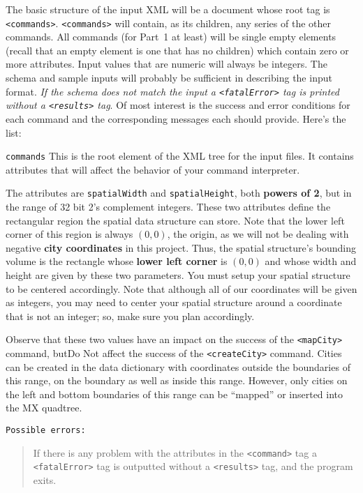 \documentclass[12pt]{article}
\newenvironment{Description}
   {\begin{list}{}{\let\makelabel\Descriptionlabel
      \setlength\leftmargin{\labelwidth+\labelsep}
      \setlength\itemindent{-0.3em}}}%
   {\end{list}}
\newcommand*{\Descriptionlabel}[1]{%
  \parbox[b]{\labelwidth}
  {\makebox[0pt][l]{\textbf{#1}}\\}
  \hfill}
\begin{document}
The basic structure of the input XML will be a document whose root tag
is \texttt{<commands>}.  \texttt{<commands>} will contain, as its
children, any series of the other commands.  All commands (for Part~1
at least) will be single empty elements (recall that an empty element
is one that has no children) which contain zero or more
attributes. Input values that are numeric will always be integers.
The schema and sample inputs will probably be sufficient in describing
the input format.  \emph{If the schema does not match the input a \texttt{<fatalError>} 
tag is printed without a \texttt{<results>} tag}. Of most interest is the success and error
conditions for each command and the corresponding messages each should
provide.  Here's the list:

\begin{Description}

\item[\texttt{commands}] This is the root element of the XML tree for
  the input files.  It contains attributes that will affect the
  behavior of your command interpreter.

The attributes are \texttt{spatialWidth} and
  \texttt{spatialHeight},  both {\bf powers of 2}, but in the range of
   32 bit 2's   complement integers.  These two attributes define the
  rectangular region the spatial data structure can store.  Note that
  the lower left corner of this region is always $(0,0)$, the origin,
  as we will not be dealing with negative {\bf city coordinates} in this project.
  Thus, the spatial structure's bounding volume is the rectangle whose
  {\bf lower left corner} is $(0,0)$ and whose width and height are given by
  these two parameters.  You must setup your spatial structure to be
  centered accordingly.  Note that although all of our coordinates
  will be given as integers, you may need to center your spatial
  structure around a coordinate that is not an integer; so, make sure
  you plan accordingly.

  Observe that these two values  have an impact on the success of 
the \texttt{<mapCity>} command, but{\sc Do Not}  affect the success of the
  \texttt{<createCity>} command.  Cities can be created in the data
  dictionary with coordinates outside the boundaries of this range, on
  the boundary as well as inside this range. However, only cities on
  the left and bottom boundaries of this range can be ``mapped'' or
  inserted into the MX quadtree.
  
  	\texttt{Possible errors:}
	\begin{quote}
		If there is any problem with the attributes in the \texttt{<command>} tag a \texttt{<fatalError>} tag is outputted without a \texttt{<results>} tag, and the program exits.
	\end{quote}
	

\end{Description}
\end{document}

